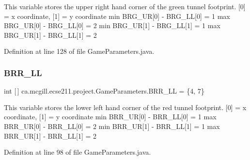 This variable stores the upper right hand corner of the green tunnel footprint. \mbox{[}0\mbox{]} = x coordinate, \mbox{[}1\mbox{]} = y coordinate min B\+R\+G\+\_\+\+UR\mbox{[}0\mbox{]} -\/ B\+R\+G\+\_\+\+LL\mbox{[}0\mbox{]} = 1 max B\+R\+G\+\_\+\+UR\mbox{[}0\mbox{]} -\/ B\+R\+G\+\_\+\+LL\mbox{[}0\mbox{]} = 2 min B\+R\+G\+\_\+\+UR\mbox{[}1\mbox{]} -\/ B\+R\+G\+\_\+\+LL\mbox{[}1\mbox{]} = 1 max B\+R\+G\+\_\+\+UR\mbox{[}1\mbox{]} -\/ B\+R\+G\+\_\+\+LL\mbox{[}1\mbox{]} = 2 

Definition at line 128 of file Game\+Parameters.\+java.

\mbox{\label{classca_1_1mcgill_1_1ecse211_1_1project_1_1_game_parameters_a8695da7f04954ea1513082740fd2d57f}} 
\subsubsection{\texorpdfstring{B\+R\+R\+\_\+\+LL}{BRR\_LL}}
{\footnotesize\ttfamily int \mbox{[}$\,$\mbox{]} ca.\+mcgill.\+ecse211.\+project.\+Game\+Parameters.\+B\+R\+R\+\_\+\+LL = \{4, 7\}\hspace{0.3cm}{\ttfamily [static]}}

This variable stores the lower left hand corner of the red tunnel footprint. \mbox{[}0\mbox{]} = x coordinate, \mbox{[}1\mbox{]} = y coordinate min B\+R\+R\+\_\+\+UR\mbox{[}0\mbox{]} -\/ B\+R\+R\+\_\+\+LL\mbox{[}0\mbox{]} = 1 max B\+R\+R\+\_\+\+UR\mbox{[}0\mbox{]} -\/ B\+R\+R\+\_\+\+LL\mbox{[}0\mbox{]} = 2 min B\+R\+R\+\_\+\+UR\mbox{[}1\mbox{]} -\/ B\+R\+R\+\_\+\+LL\mbox{[}1\mbox{]} = 1 max B\+R\+R\+\_\+\+UR\mbox{[}1\mbox{]} -\/ B\+R\+R\+\_\+\+LL\mbox{[}1\mbox{]} = 2 

Definition at line 98 of file Game\+Parameters.\+java.

\mbox{\label{classca_1_1mcgill_1_1ecse211_1_1project_1_1_game_parameters_a720d0ae20fc2466e7b77fda14bf374f3}} 
